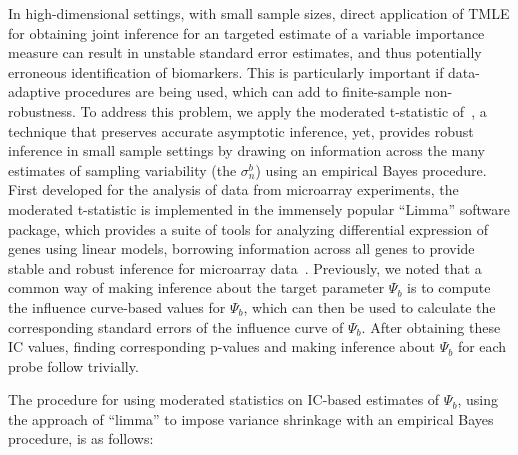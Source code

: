 In high-dimensional settings, with small sample sizes, direct application of
TMLE for obtaining joint inference for an targeted estimate of a variable
importance measure can result in unstable standard error estimates, and thus
potentially erroneous identification of biomarkers. This is particularly
important if data-adaptive procedures are being used, which can add to
finite-sample non-robustness. To address this problem, we apply the moderated
t-statistic of~\cite{smyth2005limma}, a technique that preserves accurate
asymptotic inference, yet, provides robust inference in small sample settings by
drawing on information across the many estimates of sampling variability (the
$\sigma^b_n$) using an empirical Bayes procedure. First developed for the
analysis of data from microarray experiments, the moderated t-statistic is
implemented in the immensely popular ``Limma'' software package, which provides
a suite of tools for analyzing differential expression of genes using linear
models, borrowing information across all genes to provide stable and robust
inference for microarray data~\cite{smyth2005limma}. Previously, we noted that
a common way of making inference about the target parameter $\Psi_b$ is to
compute the influence curve-based values for $\Psi_b$, which can then be used
to calculate the corresponding standard errors of the influence curve of
$\Psi_b$. After obtaining these IC values, finding corresponding p-values and
making inference about $\Psi_b$ for each probe follow trivially.

The procedure for using moderated statistics on IC-based estimates of $\Psi_b$,
using the approach of ``limma'' to impose variance shrinkage with an empirical
Bayes procedure, is as follows:

